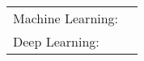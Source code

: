 \vspace{-2mm}
\begin{cventries}
	\cventry
	{}
	{\def\arraystretch{1.15}{\begin{tabular}{ l l }
		Machine Learning:  & {\skill{ Imbalance Classification, Statistical Analysis}} \\
		Deep Learning:  & {\skill{ CNN}} \\
		\end{tabular}}}
	{}
	{}
	{}
\end{cventries}